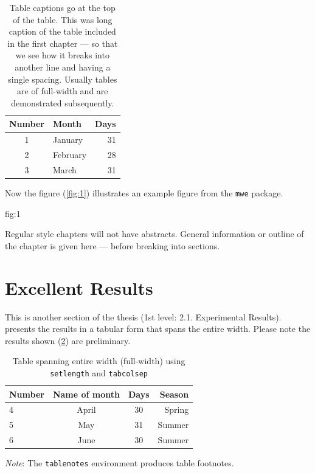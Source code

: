 \documentclass[ms-thesis,12pt,mathdesign]{ndsu-thesis-2022}
\begin{document}
\begin{table}[h]
\centering
\caption{Table captions go at the top of the table. This was long caption of the table
included in the first chapter --- so that we see how it breaks into another line and
having a single spacing. Usually tables are of full-width and are demonstrated subsequently.}
\vspace{-1ex}
\begin{tabular}{clr}
\toprule
Number & Month & Days\\
\midrule
1 & January    & 31\\
2 & February   & 28\\
3 & March      & 31\\
\bottomrule
\end{tabular}
\label{tab:1}
\end{table}	\kant[7]

Now the figure (\cref{fig:1}) illustrates an example figure from the \texttt{mwe} package.

{fig:1}	\kant[8-9]


Regular style chapters will not have abstracts. General information or outline of the
chapter is given here --- before breaking into sections.

\section{Excellent Results}
This is another section of the thesis (1st level: 2.1. Experimental Results).
 presents the results in a tabular form that spans the entire width.
Please note the results shown (\cref{tab:2}) are preliminary.

\begin{table}[ht]
\centering
\caption{Table spanning entire width (full-width) using \texttt{setlength} and
\texttt{tabcolsep}}
\vspace{-1ex}
\setlength{\tabcolsep}{3.75em}
\begin{tabular}{@{\hspace{2ex}} lccr @{\hspace{2ex}}}
\toprule
Number & Name of month & Days & Season\\
\midrule
4 	& April  & 30		& Spring\\
5 	& May    & 31		& Summer\\
6 	& June   & 30		& Summer\\
\bottomrule
\end{tabular}
\begin{tablenotes}[flushleft]
\footnotesize
\item \hspace{-1ex} \emph{Note}: The \texttt{tablenotes} environment produces table footnotes. 
\end{tablenotes}
\label{tab:2}
\end{table}	\kant[7-8]
\end{document}
